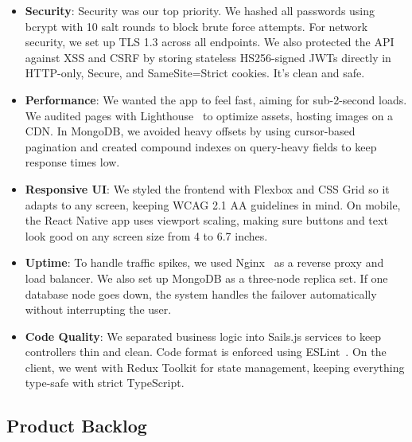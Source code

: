 \documentclass[12pt,a4paper]{report}
\begin{document}
\begin{itemize}
    \item \textbf{Security}: Security was our top priority. We hashed all passwords using bcrypt with 10 salt rounds to block brute force attempts. For network security, we set up TLS 1.3 across all endpoints. We also protected the API against XSS and CSRF by storing stateless HS256-signed JWTs directly in HTTP-only, Secure, and SameSite=Strict cookies. It's clean and safe.
    \item \textbf{Performance}: We wanted the app to feel fast, aiming for sub-2-second loads. We audited pages with Lighthouse~\cite{lighthouse} to optimize assets, hosting images on a CDN. In MongoDB, we avoided heavy offsets by using cursor-based pagination and created compound indexes on query-heavy fields to keep response times low.
    \item \textbf{Responsive UI}: We styled the frontend with Flexbox and CSS Grid so it adapts to any screen, keeping WCAG 2.1 AA guidelines in mind. On mobile, the React Native app uses viewport scaling, making sure buttons and text look good on any screen size from 4 to 6.7 inches.
    \item \textbf{Uptime}: To handle traffic spikes, we used Nginx~\cite{nginx} as a reverse proxy and load balancer. We also set up MongoDB as a three-node replica set. If one database node goes down, the system handles the failover automatically without interrupting the user.
    \item \textbf{Code Quality}: We separated business logic into Sails.js services to keep controllers thin and clean. Code format is enforced using ESLint~\cite{eslint}. On the client, we went with Redux Toolkit for state management, keeping everything type-safe with strict TypeScript.
\end{itemize}

\subsection{Product Backlog}

\renewcommand{\arraystretch}{1.3}
\setlength{\tabcolsep}{8pt}
\end{document}
